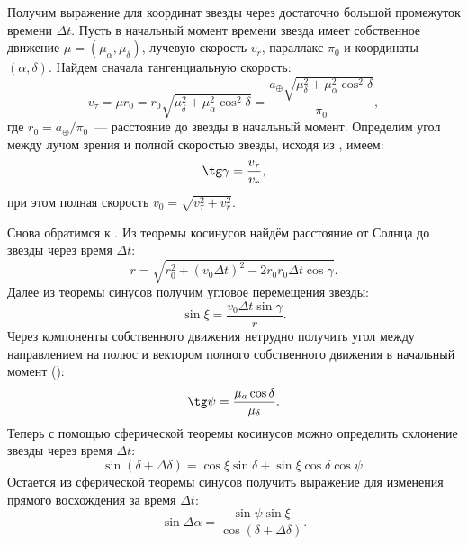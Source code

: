 Получим выражение для координат звезды через достаточно большой промежуток времени $\Delta t$. Пусть в начальный момент времени звезда имеет собственное движение $\mu = (\mu_\alpha, \mu_\delta)$, лучевую скорость $v_r$, параллакс $\pi_0$ и координаты $(\alpha, \delta)$. Найдем сначала тангенциальную скорость:
\begin{equation*}
    v_\tau =  \mu r_0 = r_0 \sqrt{ \mu_\delta^2 + \mu_\alpha^2 \cos^2 \delta} = \frac{a_\oplus \sqrt{ \mu_\delta^2 + \mu_\alpha^2 \cos^2 \delta}}{\pi_0},
\end{equation*}
где $r_0 = a_\oplus / \pi_0$~--- расстояние до звезды в начальный момент.
Определим угол между лучом зрения и полной скоростью звезды, исходя из , имеем:
\begin{equation*}
    \tg \gamma = \frac{v_\tau}{v_r},
\end{equation*}
при этом полная скорость $v_0 = \sqrt{v_\tau^2 + v_r^2}$.

Снова обратимся к . Из теоремы косинусов найдём расстояние от Солнца до звезды через время $\Delta t$:
\begin{equation*}
    r = \sqrt{r_0^2 + (v_0 \Delta t)^2 - 2 r_0 r_0 \Delta t \cos \gamma}.
\end{equation*}
Далее из теоремы синусов получим угловое перемещения звезды:
\begin{equation*}
    \sin \xi = \frac{v_0 \Delta t \sin \gamma}{r}.
\end{equation*}
Через компоненты собственного движения нетрудно получить угол между направлением на полюс и вектором полного собственного движения в начальный момент ():
\begin{equation*}
    \tg \psi =  \frac{\mu_a \cos \delta}{\mu_\delta}.
\end{equation*}
Теперь с помощью сферической теоремы косинусов можно определить склонение звезды через время $\Delta t$:
\begin{equation*}
    \sin (\delta + \Delta \delta) = \cos \xi \sin \delta + \sin \xi \cos \delta \cos \psi.
\end{equation*}
Остается из сферической теоремы синусов получить выражение для изменения прямого восхождения за время $\Delta t$:
\begin{equation*}
    \sin \Delta \alpha = \frac{\sin \psi \sin \xi}{\cos (\delta + \Delta \delta)}.
\end{equation*}


